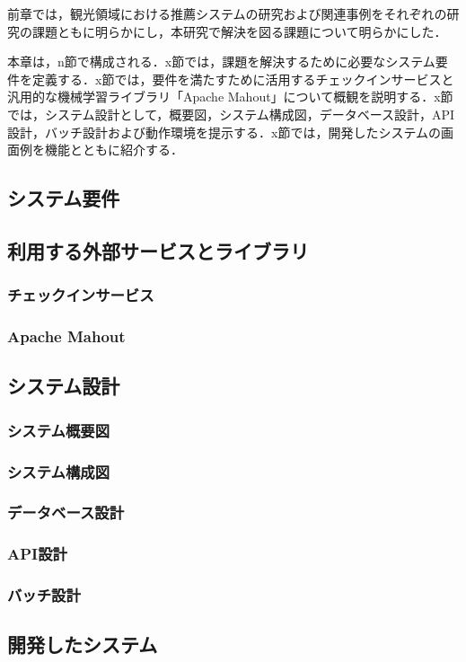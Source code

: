 \documentclass{jsarticle}
\begin{document}
前章では，観光領域における推薦システムの研究および関連事例をそれぞれの研究の課題ともに明らかにし，本研究で解決を図る課題について明らかにした．

本章は，n節で構成される．x節では，課題を解決するために必要なシステム要件を定義する．x節では，要件を満たすために活用するチェックインサービスと汎用的な機械学習ライブラリ「Apache Mahout」について概観を説明する．x節では，システム設計として，概要図，システム構成図，データベース設計，API設計，バッチ設計および動作環境を提示する．x節では，開発したシステムの画面例を機能とともに紹介する．

\subsection{システム要件}
\subsection{利用する外部サービスとライブラリ}
\subsubsection{チェックインサービス}
\subsubsection{Apache Mahout}
\subsection{システム設計}
\subsubsection{システム概要図}
\subsubsection{システム構成図}
\subsubsection{データベース設計}
\subsubsection{API設計}
\subsubsection{バッチ設計}
\subsection{開発したシステム}
\end{document}
